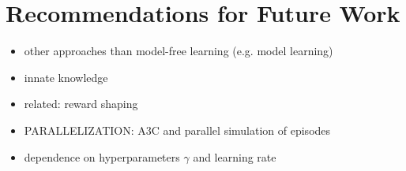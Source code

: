 \chapter{Recommendations for Future Work}
\label{ch:future_work}
\begin{itemize}
    \item other approaches than model-free learning (e.g. model learning)
    \item innate knowledge
    \item related: reward shaping
    \item PARALLELIZATION: A3C and parallel simulation of episodes
    \item dependence on hyperparameters $\gamma$ and learning rate
\end{itemize}